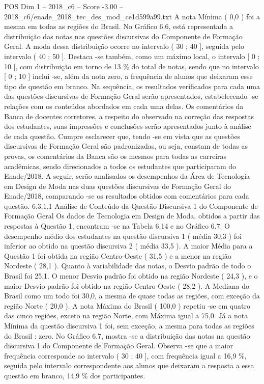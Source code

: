 \begin{textsample}{POS Dim 1 – 2018\_c6 – Score -3.00 – 2018\_c6/enade\_2018\_tec\_des\_mod\_ce1d599a99.txt}
A nota Mínima ( 0,0 ) foi a mesma em todas as regiões do Brasil.
No Gráfico 6.6, está representada a distribuição das notas nas questões discursivas do Componente de Formação Geral.
A moda dessa distribuição ocorre no intervalo ( 30 ; 40 ], seguida pelo intervalo ( 40 ; 50 ].
Destaca -se também, como um máximo local, o intervalo [ 0 ; 10 ], com distribuição em torno de 13 \% do total de notas, sendo que no intervalo [ 0 ; 10 ] inclui -se, além da nota zero, a frequência de alunos que deixaram esse tipo de questão em branco.
Na sequência, os resultados verificados para cada uma das questões discursivas de Formação Geral serão apresentados, estabelecendo -se relações com os conteúdos abordados em cada uma delas.
Os comentários da Banca de docentes corretores, a respeito do observado na correção das respostas dos estudantes, suas impressões e conclusões serão apresentados junto à análise de cada questão.
Cumpre esclarecer que, tendo -se em vista que as questões discursivas de Formação Geral são padronizadas, ou seja, constam de todas as provas, os comentários da Banca são os mesmos para todas as carreiras acadêmicas, sendo direcionados a todos os estudantes que participaram do Enade/2018.
A seguir, serão analisados os desempenhos da Área de Tecnologia em Design de Moda nas duas questões discursivas de Formação Geral do Enade/2018, comparando -se os resultados obtidos com comentários para cada questão. 6.3.1.1 Análise de Conteúdo da Questão Discursiva 1 do Componente de Formação Geral Os dados de Tecnologia em Design de Moda, obtidos a partir das respostas à Questão 1, encontram -se na Tabela 6.14 e no Gráfico 6.7.
O desempenho médio dos estudantes na questão discursiva 1 ( média 30,3 ) foi inferior ao obtido na questão discursiva 2 ( média 33,5 ).
A maior Média para a Questão 1 foi obtida na região Centro-Oeste ( 31,5 ) e a menor na região Nordeste ( 28,1 ).
Quanto à variabilidade das notas, o Desvio padrão de todo o Brasil foi 25,1.
O menor Desvio padrão foi obtido na região Nordeste ( 24,3 ), e o maior Desvio padrão foi obtido na região Centro-Oeste ( 28,2 ).
A Mediana do Brasil como um todo foi 30,0, a mesma de quase todas as regiões, com exceção da região Norte ( 20,0 ).
A nota Máxima do Brasil ( 100,0 ) repetiu -se em quatro das cinco regiões, exceto na região Norte, com Máxima igual a 75,0.
Já a nota Mínima da questão discursiva 1 foi, sem exceção, a mesma para todas as regiões do Brasil : zero.
No Gráfico 6.7, mostra -se a distribuição das notas na questão discursiva 1 do Componente de Formação Geral.
Observa -se que a maior frequência corresponde ao intervalo ( 30 ; 40 ], com frequência igual a 16,9 \%, seguida pelo intervalo correspondente aos alunos que deixaram a resposta a essa questão em branco, 14,9 \% dos participantes.

\end{textsample}
